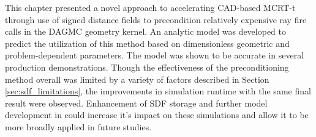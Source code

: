 This chapter presented a novel approach to accelerating CAD-based MCRT-t through
use of signed distance fields to precondition relatively expensive ray fire
calls in the DAGMC geometry kernel. An analytic model was developed to predict
the utilization of this method based on dimensionless geometric and
problem-dependent parameters. The model was shown to be accurate in several
production demonstrations. Though the effectiveness of the preconditioning
method overall was limited by a variety of factors described in Section
\ref{sec:sdf_limitations}, the improvements in simulation runtime with the same
final result were observed.  Enhancement of SDF storage and further model
development in could increase it's impact on these simulations and allow it to
be more broadly applied in future studies.
